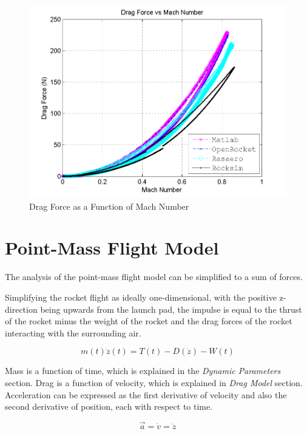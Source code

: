 \documentclass[]{article}
\begin{document}
\begin{figure}[htbp]
\centering
\includegraphics{images/plots/error_dragforce_plot.png}
\caption{Drag Force as a Function of Mach Number
\label{error_dragforce_v_plot_label}}
\end{figure}

\clearpage

\section{Point-Mass Flight Model}\label{point-mass-flight-model}

The analysis of the point-mass flight model can be simplified to a sum
of forces.

Simplifying the rocket flight as ideally one-dimensional, with the
positive z-direction being upwards from the launch pad, the impulse is
equal to the thrust of the rocket minus the weight of the rocket and the
drag forces of the rocket interacting with the surrounding air.

\begin{equation}
\label{eq_vertical_flight_eom}
m(t)\ddot{z}(t) = T(t) - D(\dot{z}) - W(t)
\end{equation}

Mass is a function of time, which is explained in the \emph{Dynamic
Parameters} section. Drag is a function of velocity, which is explained
in \emph{Drag Model} section. Acceleration can be expressed as the first
derivative of velocity and also the second derivative of position, each
with respect to time.

\begin{equation}
\vec{a} = \dot{v} = \ddot{z}
\end{equation}
\end{document}
